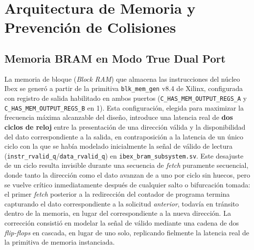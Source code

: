      

\section{Arquitectura de Memoria y Prevención de Colisiones}
\subsection{Memoria BRAM en Modo True Dual Port}
\label{ssec:bram_dual_port}

La memoria de bloque (\textit{Block RAM}) que almacena las instrucciones
del núcleo Ibex se generó a partir de la primitiva \texttt{blk\_mem\_gen}
v8.4 de Xilinx, configurada con registro de salida habilitado en ambos
puertos (\texttt{C\_HAS\_MEM\_OUTPUT\_REGS\_A} y
\texttt{C\_HAS\_MEM\_OUTPUT\_REGS\_B} en 1). Esta configuración, elegida
para maximizar la frecuencia máxima alcanzable del diseño, introduce una
latencia real de \textbf{dos ciclos de reloj} entre la presentación de una
dirección válida y la disponibilidad del dato correspondiente a la
salida, en contraposición a la latencia de un único ciclo con la que se
había modelado inicialmente la señal de válido de lectura
(\texttt{instr\_rvalid\_q}/\texttt{data\_rvalid\_q}) en
\texttt{ibex\_bram\_subsystem.sv}. Este desajuste de un ciclo resulta
invisible durante una secuencia de \textit{fetch} puramente secuencial,
donde tanto la dirección como el dato avanzan de a uno por ciclo sin
huecos, pero se vuelve crítico inmediatamente después de cualquier salto o
bifurcación tomada: el primer \textit{fetch} posterior a la redirección
del contador de programa termina capturando el dato correspondiente a la
solicitud \textit{anterior}, todavía en tránsito dentro de la memoria, en
lugar del correspondiente a la nueva dirección. La corrección consistió en
modelar la señal de válido mediante una cadena de dos \textit{flip-flops}
en cascada, en lugar de uno solo, replicando fielmente la latencia real de
la primitiva de memoria instanciada.

